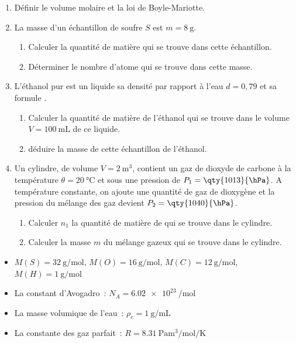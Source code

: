 \begin{enumerate}
    \item Définir le volume molaire et la loi de Boyle-Mariotte.
    \item La masse d'un échantillon de soufre $S$ est $m=\qty{8}{\g}$.
          \begin{enumerate}
              \item Calculer la quantité de matière qui se trouve dans cette
                    échantillon.
              \item Déterminer le nombre d'atome qui se trouve dans cette masse.
          \end{enumerate}
    \item L'éthanol pur est un liquide sa densité par rapport à l'eau $d=0,79$
          et sa formule .
          \begin{enumerate}
              \item Calculer la quantité de matière de l'éthanol qui se trouve
                    dans le volume $V=\qty{100}{\mL}$ de ce liquide.
              \item déduire la masse de cette échantillon de l'éthanol.
          \end{enumerate}
    \item Un cylindre, de volume $V=\qty{2}{\cubic\m}$, contient un gaz de dioxyde
          de carbone  à la température $\theta=\qty{20}{\degreeCelsius}$
          et sous une pression de $P_1=\qty{1013}{\hPa}$. A température
          constante, on ajoute une quantité de gaz de dioxygène  et la
          pression du mélange des gaz devient $P_2=\qty{1040}{\hPa}$.
          \begin{enumerate}
              \item Calculer $n_1$ la quantité de matière de  qui se
                    trouve dans le cylindre.
              \item Calculer la masse $m$ du mélange gazeux qui se trouve dans
                    le cylindre.
          \end{enumerate}
\end{enumerate}

\begin{donnees}
    \begin{itemize}
        \item $M(S)=\qty{32}{\g\per\mol}$, $M(O)=\qty{16}{\g\per\mol}$,
              $M(C)=\qty{12}{\g\per\mol}$, $M(H)=\qty{1}{\g\per\mol}$
        \item La constant d'Avogadro~: $N_A=\qty{6.02e23}{\per\mol}$
        \item La masse volumique de l'eau~: $\rho_e=\qty{1}{\g\per\mL}$
        \item La constante des gaz parfait~:
              $R=\qty{8.31}{\Pa\cubic\m\per\mol\per\K}$
    \end{itemize}
\end{donnees}
